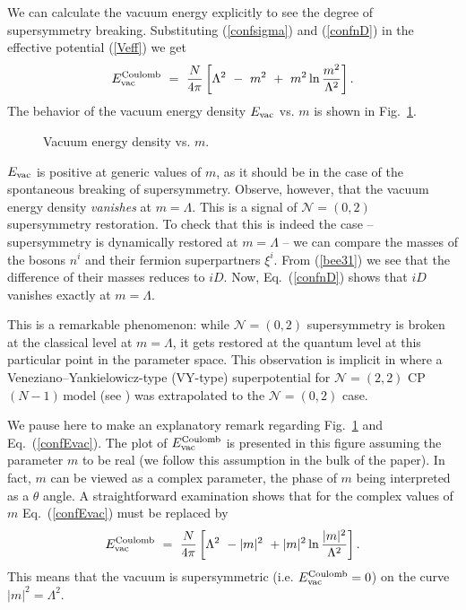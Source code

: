 \documentclass[epsfig,12pt]{article}
\def\beq{\begin{equation}}
\def\eeq{\end{equation}}
\newcommand{\cpn}{CP$(N-1)\,$}
\def\beq{\begin{equation}}
\def\eeq{\end{equation}}
\newcommand{\ntwot}{${\mathcal N}= \left(2,2\right) $ }
\newcommand{\ntwoo}{${\mathcal N}= \left(0,2\right) $ }
\begin{document}
{We can calculate the vacuum energy  explicitly to see  the degree of supersymmetry breaking.
Substituting (\ref{confsigma}) and (\ref{confnD}) in the effective potential (\ref{Veff})
we get
\beq
E_{\rm vac}^{\rm Coulomb}~=~\frac{N}{4\pi}\left[ \Lambda^2~-~m^2~+~m^2\ln {\frac{m^2}{\Lambda^2}}\right].
\label{confEvac}
\eeq
The behavior of the vacuum energy density $E_{\rm vac}$ vs. $m$ is shown  in Fig.~\ref{figvacE}.

\begin{figure}
\epsfxsize=10cm
\centerline{}
\caption{\small Vacuum energy density vs. $m$.}
\label{figvacE}
\end{figure}

$E_{\rm vac}$ is positive  at generic values of $m$, as it should be in the
 case of the spontaneous breaking of supersymmetry.
Observe, however, that the vacuum energy density {\em vanishes}
at $m=\Lambda$. This is a signal of \ntwoo supersymmetry restoration. To check that this
is indeed the case -- supersymmetry is dynamically restored at  $m=\Lambda$ -- we can
compare the masses of the bosons $n^i$ and their fermion superpartners $\xi^i$. 
From (\ref{bee31}) we see that the difference of 
their masses reduces to $iD$. Now, Eq.~(\ref{confnD}) shows that $iD$ vanishes exactly at $m=\Lambda$.

This is a remarkable phenomenon: while \ntwoo supersymmetry is broken at the classical level
at $m=\Lambda$, 
it gets restored at the quantum level at this particular point in the parameter space. 
This  observation is implicit
 in \cite{Tonghetdyn} where a Veneziano--Yankielowicz-type (VY-type)
 superpotential  \cite{VYan} for  \ntwot \cpn model (see \cite{AdDVecSal,ChVa,W93}) was
 extrapolated to   the \ntwoo  case.

We pause here to make an explanatory remark regarding Fig.~\ref{figvacE} and Eq.~(\ref{confEvac}).
The plot of $E_{\rm vac}^{\rm Coulomb}$ is presented in this figure assuming the parameter $m$
to be real (we follow this assumption in the bulk of the paper). In fact, $m$ can be viewed as a complex parameter,
the phase of $m$ being interpreted as a $\theta$ angle. A straightforward examination shows
that for the complex values of $m$ Eq.~(\ref{confEvac}) must be replaced by
$$
E_{\rm vac}^{\rm Coulomb}~=~\frac{N}{4\pi}\left[ \Lambda^2~-|m|^2~+|m|^2\ln {\frac{|m|^2}{\Lambda^2}}\right].
$$
This means that the vacuum is supersymmetric (i.e. $E_{\rm vac}^{\rm Coulomb}=0$) on the curve
$|m|^2=\Lambda^2$.

}
\end{document}
